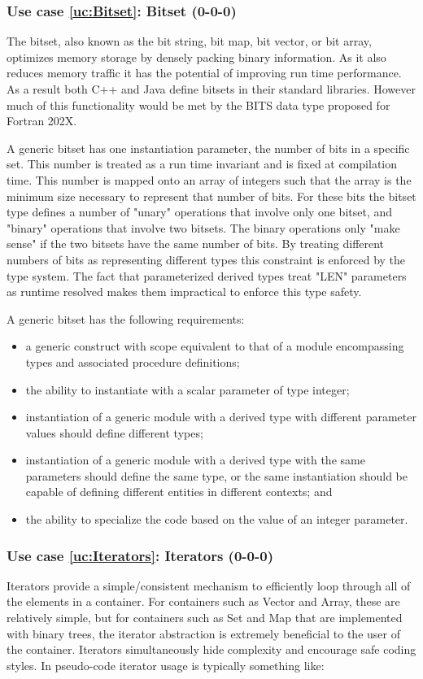 \documentclass{article}
\newcounter{usecase}
\newcounter{requirement}
\newcommand{\newusecase}[2]{
\refstepcounter{usecase}\label{uc:#1}
\subsubsection{Use case \ref{uc:#1}: #1 (#2)}}
\begin{document}
\newusecase{Bitset}{0-0-0}
The bitset, also known as the bit string, bit map, bit vector, or bit
array, optimizes memory storage by densely packing binary 
information. As it also reduces memory traffic it has the potential of
improving run time performance. As a result both C++ and Java define
bitsets in their standard libraries. However much of this
functionality would be met by the BITS data type proposed for Fortran
202X.

A generic bitset has one instantiation parameter, the number of bits
in a specific set. This number is treated as a run time invariant and
is fixed at compilation time. This number is mapped onto an array of
integers such that the array is the minimum size necessary to
represent that number of bits.  For these bits the bitset type defines
a number of "unary" operations that involve only one bitset, and
"binary" operations that involve two bitsets. The binary operations
only "make sense" if the two bitsets have the same number of bits. By
treating different numbers of bits as representing different types
this constraint is enforced by the type system. The fact that
parameterized derived types treat "LEN" parameters as runtime resolved
makes them impractical to enforce this type safety.

A generic bitset has the following requirements:
\begin{itemize}
\item a generic construct with scope equivalent to that of a module
  encompassing types and associated procedure definitions;

\item the ability to instantiate with a scalar parameter of type integer;

\item instantiation of a generic module with a derived type with different
  parameter values should define different types; 

\item instantiation of a generic module with a derived type with the same
  parameters should define the same type, or the same instantiation
  should be capable of defining different entities in different
  contexts; and

\item the ability to specialize the code based on the value of an integer
  parameter.
\end{itemize}


\newusecase{Iterators}{0-0-0}
Iterators provide a simple/consistent mechanism to efficiently loop through all of the elements in a container.  For   containers such as Vector and Array, these are relatively simple, but for containers such as Set and Map that are implemented with binary trees, the iterator abstraction is extremely beneficial to the user of the container.  Iterators simultaneously hide complexity and encourage safe coding styles.  In pseudo-code iterator usage is typically something like:
\end{document}
